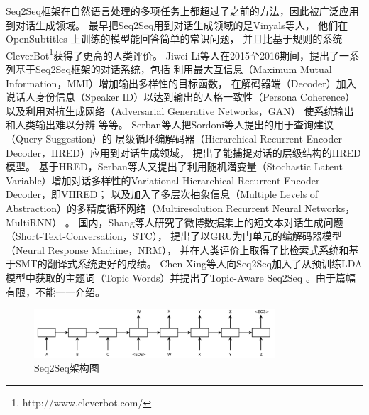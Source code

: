 Seq2Seq框架在自然语言处理的多项任务上都超过了之前的方法，因此被广泛应用到对话生成领域。
最早把Seq2Seq用到对话生成领域的是Vinyals等人，
他们在OpenSubtitles
上训练的模型能回答简单的常识问题，
并且比基于规则的系统CleverBot\footnote{http://www.cleverbot.com/}获得了更高的人类评价。
Jiwei Li等人在2015至2016期间，提出了一系列基于Seq2Seq框架的对话系统，包括
利用最大互信息（Maximum Mutual Information，MMI）增加输出多样性的目标函数，
在解码器端（Decoder）加入说话人身份信息（Speaker ID）以达到输出的人格一致性（Persona Coherence）
以及利用对抗生成网络（Adversarial Generative Networks，GAN）
使系统输出和人类输出难以分辨
等等。
Serban等人把Sordoni等人提出的用于查询建议（Query Suggestion）的
层级循环编解码器（Hierarchical Recurrent Encoder-Decoder，HRED）应用到对话生成领域， 提出了能捕捉对话的层级结构的HRED模型。
基于HRED，Serban等人又提出了利用随机潜变量（Stochastic Latent Variable）增加对话多样性的Variational Hierarchical Recurrent Encoder-Decoder，即VHRED；
以及加入了多层次抽象信息（Multiple Levels of Abstraction）的多精度循环网络（Multiresolution Recurrent Neural Networks，MultiRNN）
。
国内，Shang等人研究了微博数据集上的短文本对话生成问题（Short-Text-Conversation，STC），
提出了以GRU为门单元的编解码器模型（Neural Response Machine，NRM），
并在人类评价上取得了比检索式系统和基于SMT的翻译式系统更好的成绩。
Chen Xing等人向Seq2Seq加入了从预训练LDA模型中获取的主题词（Topic Words）并提出了Topic-Aware Seq2Seq
。由于篇幅有限，不能一一介绍。



\begin{figure}[H]
    \centering
    \includegraphics[width=0.8\textwidth]{figure/Seq2Seq.png}
    \caption{Seq2Seq架构图}
    \label{fig:Seq2Seq}
\end{figure}


